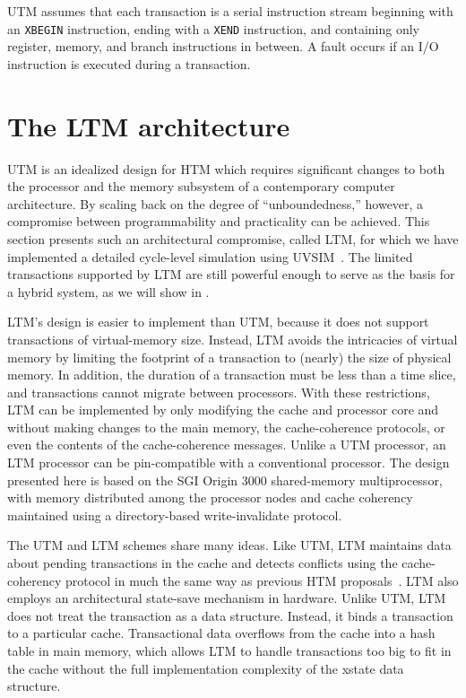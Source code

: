 UTM assumes that each transaction is a serial instruction stream
beginning with an \texttt{XBEGIN} instruction, ending with a
\texttt{XEND} instruction, and containing only register, memory, and
branch instructions in between.  A fault occurs if an I/O instruction
is executed during a transaction.

\section{The LTM architecture}\label{sec:ltm}

UTM is an idealized design for HTM which requires significant
changes to both the processor and the memory subsystem of a contemporary
computer architecture.  By scaling back on the degree of
``unboundedness,'' however, a compromise between programmability and
practicality can be achieved.  This section presents such an
architectural compromise, called LTM, for which we have implemented
a detailed cycle-level simulation using UVSIM~\cite{Zhang03}.
The limited transactions supported by LTM are still powerful enough to
serve as the basis for a hybrid system, as we will show in
.

LTM's design is easier to implement than UTM, because it does
not support transactions of virtual-memory size.  Instead, LTM
avoids the intricacies of virtual memory by limiting the footprint of
a transaction to (nearly) the size of physical memory.  In addition,
the duration of a transaction must be less than a time slice, and
transactions cannot migrate between processors.  With these
restrictions, LTM can be implemented by only modifying the cache
and processor core and without making changes to the main memory, the
cache-coherence protocols, or even the contents of the cache-coherence
messages.  Unlike a UTM processor, an LTM processor can be
pin-compatible with a conventional processor.  The design presented
here is based on the SGI Origin 3000 shared-memory multiprocessor,
with memory distributed among the processor nodes and cache coherency
maintained using a directory-based write-invalidate protocol.

The UTM and LTM schemes share many ideas.  Like UTM, LTM
maintains data about pending transactions in the cache and detects
conflicts using the cache-coherency protocol in much the same way as
previous HTM proposals~\cite{Knight86, HerlihyMo92}.  LTM also employs an
architectural state-save mechanism in hardware.  Unlike UTM, LTM
does not treat the transaction as a data structure.  Instead, it binds
a transaction to a particular cache.  Transactional data overflows
from the cache into a hash table in main memory, which allows LTM
to handle transactions too big to fit in the cache without the
full implementation complexity of the xstate data structure.

